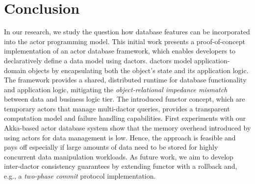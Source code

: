 
\section{Conclusion}\label{sec:conclusion}

In our research, we study the question how database features can be incorporated into the actor programming model. This initial work presents a proof-of-concept implementation of an actor database framework, which enables developers to declaratively define a data model using \glspl{dactor}.
\Glspl{dactor} model application-domain objects by encapsulating both the object's state and its application logic.
The framework provides a shared, distributed runtime for database functionality and application logic, mitigating the \textit{object-relational impedance mismatch} between data and business logic tier.
The introduced \gls{functor} concept, which are temporary actors that manage multi-\gls{dactor} queries, provides a transparent computation model and failure handling capabilities.
First experiments with our Akka-based actor database system show that the memory overhead introduced by using actors for data management is low.
Hence, the approach is feasible and pays off especially if large amounts of data need to be stored for highly concurrent data manipulation workloads.
As future work, we aim to develop inter-\gls{dactor} consistency guarantees by extending \gls{functor} with a rollback and, e.g., a \textit{two-phase commit} protocol implementation.
